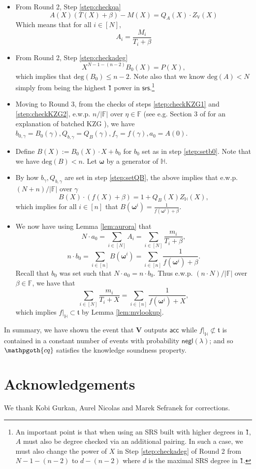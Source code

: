 \documentclass[11pt]{article} %
\newcommand{\cq}{\ensuremath{\mathpgoth{cq} }\xspace}
\newcommand{\F}{\ensuremath{\mathbb F}\xspace}
\newcommand{\srs}{\ensuremath{\mathsf{srs}}\xspace}
\renewcommand{\deg}{\ensuremath{\mathrm{deg}}\xspace}
\newcommand{\negl}{\ensuremath{\mathsf{negl}(\lambda)}\xspace}
\newcommand{\acc}{\ensuremath{\mathsf{acc}}\xspace}
\newcommand{\defeq}{:=}
\newcommand{\ver}{\ensuremath{\mathsf{\mathbf{V}}}\xspace}
\newcommand{\hgen}{\ensuremath{\mathbf{\omega}}\xspace}
\newcommand{\restricttoset}[2]{\ensuremath{#1|_{#2}}\xspace}
\newcommand{\subspace}{\ensuremath{\mathbb{H}}\xspace}
\newcommand{\bigspace}{\ensuremath{\mathbb{V}}\xspace}
\newcommand{\witsize}{\ensuremath{n}\xspace}
\newcommand{\tabsize}{\ensuremath{N}\xspace}
\newcommand{\tab}{\ensuremath{\mathfrak{t}}\xspace}
\newcommand{\bgam}{\ensuremath{b_\gamma}\xspace}
\newcommand{\bzergam}{\ensuremath{b_{0,\gamma}}\xspace}
\newcommand{\qbgam}{\ensuremath{Q_{b,\gamma}}\xspace}
\newcommand{\fgam}{\ensuremath{f_{\gamma}}\xspace}
\newcommand{\degoffset}{\ensuremath{\tabsize-1-(\witsize-2)}\xspace}
\begin{document}
\begin{itemize}
 \item From Round 2, Step \ref{step:checkqa} \[A(X)(T(X)+\beta)-M(X) = Q_A(X)\cdot Z_\bigspace(X)\]
Which means that for all $i\in [\tabsize]$,
\[A_i=\frac{M_i}{T_i+\beta}\]

\item From Round 2, Step  \ref{step:checkadeg}
\[X^{\degoffset}B_0(X)=P(X),\]
which implies  that  $\deg(B_0)\leq\witsize-2$. Note also that we know $\deg(A)<\tabsize$ simply from \enc1{x^{\tabsize-1}} being the highest \G1 power in \srs.\footnote{An important
point is that when using an SRS built with higher degrees in \G1, $A$ must also be degree checked via an additional pairing. In such a case, we must also change the power of $X$ in Step \ref{step:checkadeg} of Round 2 from $\degoffset$ to $d-(\witsize-2)$ where $d$ is the maximal SRS degree in \G1.}

\item Moving to Round 3, from the checks of steps \ref{step:checkKZG1} and \ref{step:checkKZG2},  e.w.p. $\witsize/|\F|$ over $\eta\in\F$ (see e.g. Section 3 of \cite{plonk} for an explanation of batched KZG \cite{kate}), we have  
$\bzergam = B_0(\gamma),\qbgam =Q_B(\gamma),\fgam =f(\gamma),a_0=A(0)$.
\item Define $B(X)\defeq B_0(X)\cdot X + b_0$ for $b_0$ set as in step \ref{step:setb0}. 
Note that we have $\deg(B)<\witsize$. Let \hgen by a generator of \subspace.

\item By how $\bgam,\qbgam$ are set in step \ref{step:setQB},  the above implies that e.w.p. $(\tabsize+ \witsize)/|\F|$ over $\gamma$ 
\[B(X)\cdot (f(X)+\beta)=1+ Q_B(X)Z_\subspace(X),\]
which implies for all $i\in [\witsize]$ that
$B(\hgen^i)=\frac{1}{f(\hgen^i)+\beta}$.

\item We now have using Lemma \ref{lem:aurora} that
\[\tabsize\cdot a_0 = \sum_{i\in [\tabsize]} A_i = \sum_{i\in [\tabsize]}\frac{m_i}{T_i+\beta},\]
\[\witsize\cdot b_0 = \sum_{i\in [\witsize]} B(\hgen^i) = \sum_{i\in [\witsize]}\frac{1}{f(\hgen^i)+\beta}.\]
Recall that $b_0$ was set such that $\tabsize \cdot a_0=\witsize\cdot b_0 $.
Thus e.w.p. $(\witsize\cdot \tabsize)/|\F|$ over $\beta\in \F$, we have that
\[\sum_{i\in [\tabsize]}\frac{m_i}{T_i+X}=\sum_{i\in [\witsize]}\frac{1}{f(\hgen^i)+X},\]
which implies $\restricttoset{f}{\subspace}\subset \tab$ by Lemma \ref{lem:mvlookup}.
\end{itemize}
In summary, we have shown the event that \ver outputs \acc while $\restricttoset{f}{\subspace}\not\subset \tab$
is contained in a constant number of events with probability \negl; and so \cq satisfies the knowledge soundness property.
\section*{Acknowledgements}
We thank Kobi Gurkan, Aurel Nicolas and Marek Sefranek for corrections.


\end{document}
